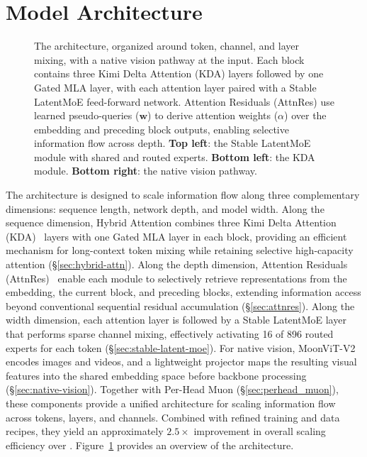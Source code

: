 
\section{Model Architecture}
\label{sec:arch}

\begin{figure}[t]
    \centering
    \resizebox{0.9\textwidth}{!}{}
    \caption{The  architecture, organized around token, channel, and layer mixing, with a native vision pathway at the input.
        Each block contains three Kimi Delta Attention (KDA) layers followed by one Gated MLA layer, with each attention layer paired with a Stable LatentMoE feed-forward network.
        Attention Residuals (AttnRes) use learned pseudo-queries ($\bm{w}$) to derive attention weights ($\alpha$) over the embedding and preceding block outputs, enabling selective information flow across depth.
        \textbf{Top left}: the Stable LatentMoE module with shared and routed experts.
        \textbf{Bottom left}: the KDA module.
        \textbf{Bottom right}: the native vision pathway.}
    \label{fig:arch}
\end{figure}

The  architecture is designed to scale information flow along three complementary dimensions: sequence length, network depth, and model width.
Along the sequence dimension, Hybrid Attention combines three Kimi Delta Attention (KDA)~\citep{team2025kimi} layers with one Gated MLA layer in each block, providing an efficient mechanism for long-context token mixing while retaining selective high-capacity attention (\S\ref{sec:hybrid-attn}).
Along the depth dimension, Attention Residuals (AttnRes)~\citep{kimiteam2026attnres} enable each module to selectively retrieve representations from the embedding, the current block, and preceding blocks, extending information access beyond conventional sequential residual accumulation (\S\ref{sec:attnres}).
Along the width dimension, each attention layer is followed by a Stable LatentMoE layer that performs sparse channel mixing, effectively activating 16 of 896 routed experts for each token (\S\ref{sec:stable-latent-moe}).
For native vision, MoonViT-V2 encodes images and videos, and a lightweight projector maps the resulting visual features into the shared embedding space before backbone processing (\S\ref{sec:native-vision}).
Together with Per-Head Muon (\S\ref{sec:perhead_muon}), these components provide a unified architecture for scaling information flow across tokens, layers, and channels. Combined with refined training and data recipes, they yield an approximately $2.5\times$ improvement in overall scaling efficiency over .
Figure~\ref{fig:arch} provides an overview of the architecture.

